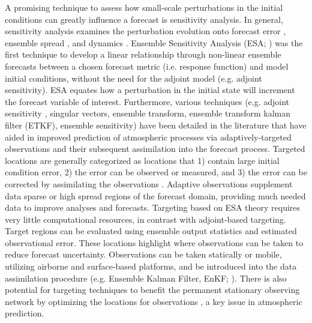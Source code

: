 \documentclass{ttuthes2007}
\newcommand{\tab}{\hspace*{2em}}  %
\begin{document}
\tab A promising technique to assess how small-scale perturbations in the initial conditions can greatly influence a forecast is sensitivity analysis. In general, sensitivity analysis examines the perturbation evolution onto forecast error \citep[e.g.,][]{LiuandKalnay2008,Kalnayetal2012,KangandXu2012,Ancell2013}, ensemble spread \citep[e.g.,][]{HamillandSnyder2002,QinandMu2011}, and dynamics \citep[e.g.,][]{MartinandXue2006,MelhauserandZhang2012}. Ensemble Sensitivity Analysis (ESA; \citealt{AncellandHakim2007a,HakimandTorn2008,TornandHakim2008a}) was the first technique to develop a linear relationship through non-linear ensemble forecasts between a chosen forecast metric (i.e. response function) and model initial conditions, without the need for the adjoint model (e.g. adjoint sensitivity). ESA equates how a perturbation in the initial state will increment the forecast variable of interest. Furthermore, various techniques (e.g. adjoint sensitivity \citep{LanglandandBaker2004}, singular vectors, ensemble transform, ensemble transform kalman filter (ETKF), ensemble sensitivity) have been detailed in the literature that have aided in improved prediction of atmospheric processes via adaptively-targeted observations  and their subsequent assimilation into the forecast process. Targeted locations are generally categorized as locations that 1) contain large initial condition error, 2) the error can be observed or measured, and 3) the error can be corrected by assimilating the observations \citep{Langland2005}. Adaptive observations supplement data sparse \citep{Morssetal2001} or high spread regions of the forecast domain, providing much needed data to improve analyses \citep{HamillandSnyder2002} and forecasts. Targeting based on ESA theory requires very little computational resources, in contrast with adjoint-based targeting. Target regions can be evaluated using ensemble output statistics and estimated observational error. These locations highlight where observations can be taken to reduce forecast uncertainty. Observations can be taken statically or mobile, utilizing airborne and surface-based platforms, and be introduced into the data assimilation procedure (e.g. Ensemble Kalman Filter, EnKF; \citealt{Evensen1994}). There is also potential for targeting techniques to benefit the permanent stationary observing network by optimizing the locations for observations \citep{Langland2005,AncellandHakim2007a}, a key issue in atmospheric prediction. \\
\end{document}
